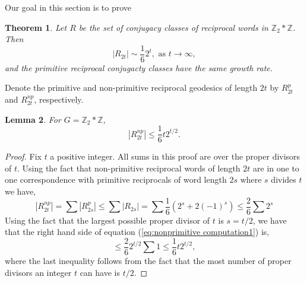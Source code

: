 \documentclass[11pt]{amsart}
\numberwithin{equation}{section}
\theoremstyle{plain}
\newtheorem{thm}{Theorem}[section]
\newtheorem{lem}[thm]{Lemma}
\begin{document}
Our goal in this section is to prove

\begin{thm}\label{thm:growth prim conjugacy special commutators}
	Let  $R$ be the set of  conjugacy classes  of reciprocal words in $\mathbb{Z}_{2}\ast \mathbb{Z}$.   Then
\begin{equation}
	 |R_{2t}| \sim \frac{1}{6} 2^{t}, \text{  as  } t \rightarrow \infty,
	\end{equation}
and the primitive reciprocal conjugacty classes have the same growth rate. 	
\end{thm}

Denote the primitive and non-primitive reciprocal geodesics of length $2t$ by $R^{p}_{2t}$  and $R^{np}_{2t}$, respectively. 


\begin{lem}\label{lem:nonprimitive bound} For  $G=\mathbb{Z}_2\ast \mathbb{Z}$,
	\begin{equation}
	|R^{np}_{2t}|\leq  \frac{1}{6} t  2^{t/2}.
	\end{equation}        
\end{lem}

\begin{proof}
	Fix $t$ a positive integer. All sums in this proof are over the proper divisors of $t$. Using the fact that non-primitive reciprocal words of length 
	$2t$ are in one to one correspondence with primitive reciprocals of word length $2s$ where $s$ divides $t$  we have,
	\begin{equation}\label{eq:nonprimitive computation1}
	|R^{np}_{2t}|=\sum |R^{p}_{2s}| \leq \sum |R_{2s}|=\sum \frac{1}{6}(2^{s}+2(-1)^{s})  \leq \frac{2}{6} \sum 2^{s} 
	\end{equation}
	Using the fact that the largest possible proper divisor of $t$ is $s=t/2$, we have that the right hand side of equation (\ref{eq:nonprimitive computation1}) is,
	\begin{equation}\label{eq:nonprimitive computation2}
	\leq   \frac{2}{6}   2^{t/2}\sum 1 \leq  \frac{1}{6} t  2^{t/2},
	\end{equation}
	where the last inequality follows from the fact that the most number of proper divisors an integer $t$ can have is $t/2$.
	
	
	
\end{proof}
\end{document}
